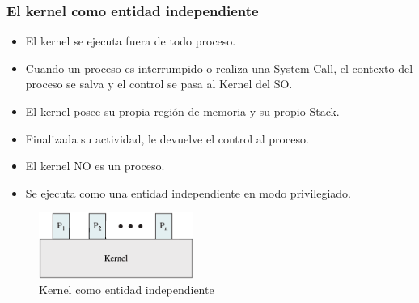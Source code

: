 \subsubsection{El kernel como entidad independiente}
\begin{itemize}
    \item El kernel se ejecuta fuera de todo proceso.
    \item Cuando un proceso es interrumpido o realiza una System Call, el contexto del proceso se salva y el control se pasa al Kernel del SO.
    \item El kernel posee su propia región de memoria y su propio Stack.
    \item Finalizada su actividad, le devuelve el control al proceso.
    \item El kernel NO es un proceso.
    \item Se ejecuta como una entidad independiente en modo privilegiado.
\end{itemize}
\begin{figure}[h]
    \begin{center}
        \includegraphics[width=0.45\textwidth]{assets/Kernel1.eps}
    \end{center}
    \caption{Kernel como entidad independiente}\label{fig:}
\end{figure}

\vspace{2cm}

